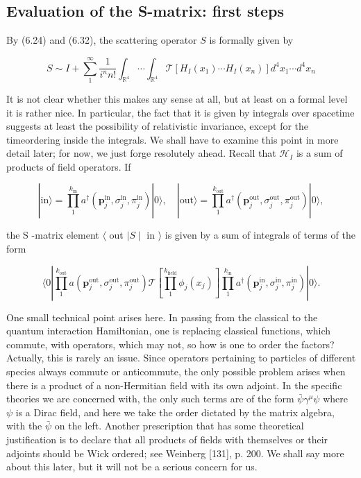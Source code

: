 \documentclass[10pt, letterpaper]{article}
\begin{document}
\subsection*{Evaluation of the S-matrix: first steps}
By (6.24) and (6.32), the scattering operator $S$ is formally given by

$$
S \sim I+\sum_{1}^{\infty} \frac{1}{i^{n} n!} \int_{\mathbb{R}^{4}} \cdots \int_{\mathbb{R}^{4}} \mathcal{T}\left[H_{I}\left(x_{1}\right) \cdots H_{I}\left(x_{n}\right)\right] d^{4} x_{1} \cdots d^{4} x_{n}
$$

It is not clear whether this makes any sense at all, but at least on a formal level it is rather nice. In particular, the fact that it is given by integrals over spacetime suggests at least the possibility of relativistic invariance, except for the timeordering inside the integrals. We shall have to examine this point in more detail later; for now, we just forge resolutely ahead. Recall that $\mathcal{H}_{I}$ is a sum of products of field operators. If

$$
|\mathrm{in}\rangle=\prod_{1}^{k_{\mathrm{in}}} a^{\dagger}\left(\mathbf{p}_{j}^{\mathrm{in}}, \sigma_{j}^{\mathrm{in}}, \pi_{j}^{\mathrm{in}}\right)|0\rangle, \quad|\mathrm{out}\rangle=\prod_{1}^{k_{\mathrm{out}}} a^{\dagger}\left(\mathbf{p}_{j}^{\mathrm{out}}, \sigma_{j}^{\mathrm{out}}, \pi_{j}^{\mathrm{out}}\right)|0\rangle,
$$

the S -matrix element $\langle$ out $| S \mid$ in $\rangle$ is given by a sum of integrals of terms of the form

$$
\langle 0| \prod_{1}^{k_{\mathrm{out}}} a\left(\mathbf{p}_{j}^{\mathrm{out}}, \sigma_{j}^{\mathrm{out}}, \pi_{j}^{\mathrm{out}}\right) \mathcal{T}\left[\prod_{1}^{k_{\mathrm{field}}} \phi_{j}\left(x_{j}\right)\right] \prod_{1}^{k_{\mathrm{in}}} a^{\dagger}\left(\mathbf{p}_{j}^{\mathrm{in}}, \sigma_{j}^{\mathrm{in}}, \pi_{j}^{\mathrm{in}}\right)|0\rangle .
$$

One small technical point arises here. In passing from the classical to the quantum interaction Hamiltonian, one is replacing classical functions, which commute, with operators, which may not, so how is one to order the factors? Actually, this is rarely an issue. Since operators pertaining to particles of different species always commute or anticommute, the only possible problem arises when there is a product of a non-Hermitian field with its own adjoint. In the specific theories we are concerned with, the only such terms are of the form $\bar{\psi} \gamma^{\mu} \psi$ where $\psi$ is a Dirac field, and here we take the order dictated by the matrix algebra, with the $\bar{\psi}$ on the left. Another prescription that has some theoretical justification is to declare that all products of fields with themselves or their adjoints should be Wick ordered; see Weinberg [131], p. 200. We shall say more about this later, but it will not be a serious concern for us.
\end{document}
